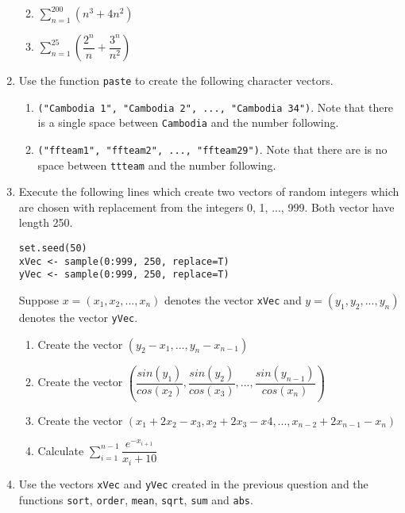 \documentclass[11pt,a4paper]{article}
\begin{document}
\begin{enumerate}
	\begin{multicols}{2}
		\begin{enumerate}
			\everymath{\displaystyle}  
			\item $\sum_{n=1}^{200}(n^{3}+4n^{2})$
			\item $\sum_{n=1}^{25}(\dfrac{2^{n}}{n} + \dfrac{3^{n}}{n^{2}})$ 
		\end{enumerate}
	\end{multicols}
	
	\item Use the function \texttt{paste} to create the following character vectors. 
	\begin{enumerate}
		\item \texttt{("Cambodia 1", "Cambodia 2", ..., "Cambodia 34")}. Note that there is a single space between \texttt{Cambodia} and the number following. 
		\item \texttt{("ffteam1", "ffteam2", ..., "ffteam29")}. Note that there are is no space between \texttt{ttteam} and the number following.  
	\end{enumerate}

	\item Execute the following lines which create two vectors of random integers which are chosen with replacement from the integers 0, 1, ..., 999. Both vector have length 250. 
	
	\texttt{set.seed(50) \\
	xVec <- sample(0:999, 250, replace=T)\\
	yVec <- sample(0:999, 250, replace=T)}

	Suppose $x = (x_{1}, x_{2}, ..., x_{n})$ denotes the vector \texttt{xVec} and $y = (y_{1}, y_{2}, ..., y_{n})$ denotes the vector \texttt{yVec}.
	
	\begin{enumerate}
		\item Create the vector $(y_{2}-x_{1}, ..., y_{n}-x_{n-1})$
		\item Create the vector $\left ( \dfrac{sin(y_{1})}{cos(x_{2})}, \dfrac{sin(y_{2})}{cos(x_{3})}, ..., \dfrac{sin(y_{n-1})}{cos(x_{n})}\right )$
		\item Create the vector $(x_{1} + 2x_{2} - x_{3}, x_{2} + 2x_{3} - x{4}, ..., x_{n-2} +2x_{n-1} - x_{n})$
		\everymath{\displaystyle}  
		\item Calculate $\sum_{i=1}^{n-1} \dfrac{e^{-x_{i+1}}}{x_{i} + 10}$
	\end{enumerate}

	\item Use the vectors \texttt{xVec} and \texttt{yVec} created in the previous question and the functions \texttt{sort}, \texttt{order}, \texttt{mean}, \texttt{sqrt}, \texttt{sum} and \texttt{abs}. 
	

\end{enumerate}
\end{document}
